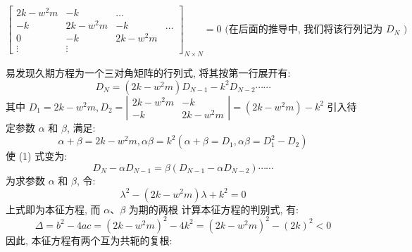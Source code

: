 \documentclass[11pt, a4paper, oneside]{ctexart}
\begin{document}
{{{\begin{appendices}
{$$
\left[\begin{array}{cccc}
2 k-w^{2} m & -k & \ldots & \\
-k & 2 k-w^{2} m & -k & \ldots \\
0 & -k & 2 k-w^{2} m & \\
\vdots & \vdots & &
\end{array}\right]_{N \times N}=0 \text { (在后面的推导中, 我们将该行列记为 } D_{N} \text { ) }
$$

易发现久期方程为一个三对角矩阵的行列式, 将其按第一行展开有:
$$
D_{N}=\left(2 k-w^{2} m\right) D_{N-1}-k^{2} D_{N-2} \cdots \cdots
$$
其中 $D_{1}=2 k-w^{2} m, D_{2}=\left|\begin{array}{cc}2 k-w^{2} m & -k \\ -k & 2 k-w^{2} m\end{array}\right|=\left(2 k-w^{2} m\right)-k^{2}$ 引入待定参数 $\alpha$ 和 $\beta$, 满足:
$$
\alpha+\beta=2 k-w^{2} m, \alpha \beta=k^{2}\left(\alpha+\beta=D_{1}, \alpha \beta=D_{1}^{2}-D_{2}\right)
$$
使 (1) 式变为:
$$
D_{N}-\alpha D_{N-1}=\beta\left(D_{N-1}-\alpha D_{N-2}\right) \cdots \cdots
$$
为求参数 $\alpha$ 和 $\beta$, 令:
$$
\lambda^{2}-\left(2 k-w^{2} m\right) \lambda+k^{2}=0
$$
上式即为本征方程, 而 $\alpha 、 \beta$ 为期的两根
计算本征方程的判别式, 有:
$$
\Delta=b^{2}-4 a c=\left(2 k-w^{2} m\right)^{2}-4 k^{2}=\left(2 k-w^{2} m\right)^{2}-(2 k)^{2}<0
$$
因此, 本征方程有两个互为共轭的复根:

}
\end{appendices}}}}
\end{document}
